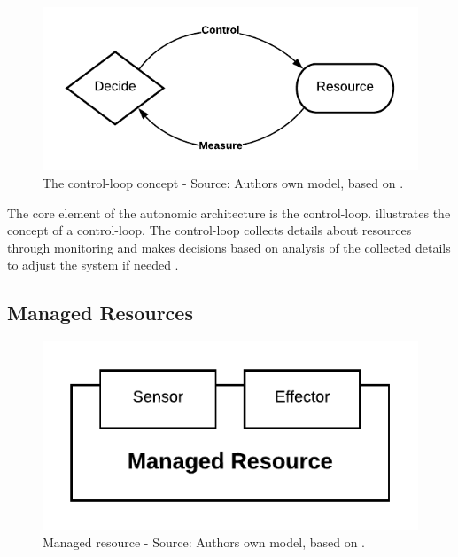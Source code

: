 \begin{figure}[h]
\centering
\includegraphics[scale=1]{images/02_theoretical_foundation/autonomic_computing/control_loop}
\caption{The control-loop concept - Source: Authors own model, based on \cite{Murch2004Autonomic}.}
\label{fig:ac_control_loop}
\end{figure}

The core element of the autonomic architecture is the control-loop.  illustrates the concept of a control-loop. The control-loop collects details about resources through monitoring and makes decisions based on analysis of the collected details to adjust the system if needed \cite{Murch2004Autonomic}.


\subsection{Managed Resources}
\label{subsec:02_ac_resources}
\begin{figure}[h]
\centering
\includegraphics[scale=1]{images/02_theoretical_foundation/autonomic_computing/managed_resource}
\caption{Managed resource - Source: Authors own model, based on \cite{Jacob2004AutonomicSolution}.}
\label{fig:ac_managed_resource}
\end{figure}

